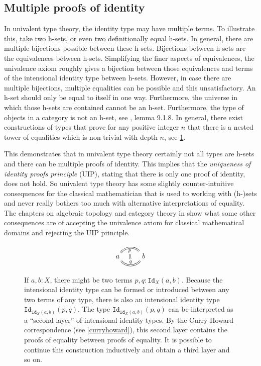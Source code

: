 \documentclass[12pt,a4paper,twoside,xetex]{book} %
\newcommand{\keyword}[1]{\emph{#1}\index{#1}}
\newcommand{\op}[1]{\mathtt{#1}}
\begin{document}
\subsection{Multiple proofs of identity}

In univalent type theory, the identity type may have multiple terms. To illustrate this, take two h-sets, or even two definitionally equal h-sets. In general, there are 
multiple bijections possible between these h-sets. Bijections between h-sets 
are the equivalences between h-sets. Simplifying the finer aspects of 
equivalences, the univalence axiom roughly gives a bijection between those equivalences and terms of the intensional identity 
type between h-sets. However, in case there are multiple bijections, 
multiple equalities can be possible and this unsatisfactory. An h-set should only be equal to 
itself in one way. Furthermore, the universe in which those h-sets are contained 
cannot be an h-set. Furthermore, the type of objects in a category is not an h-set, see \cite{Voevodsky2013}, 
lemma 9.1.8. In general, there exist constructions of types that prove for any 
positive integer $n$ that there is a nested tower of equalities which is non-trivial 
with depth $n$, see \cref{secondleveleq}.  

This demonstrates that in univalent type theory certainly not all types are h-sets and there can be multiple proofs of identity. This implies that the \keyword{uniqueness of identity proofs 
principle} (UIP), stating that there is only one proof of identity, does not hold. So univalent type theory has some slightly 
counter-intuitive consequences for the classical mathematician that is used to 
working with (h-)sets and never really bothers too much with alternative 
interpretations of equality. The chapters on algebraic topology and category 
theory in \cite{Voevodsky2013} show what some other consequences are of 
accepting the univalence axiom for classical mathematical domains and rejecting 
the UIP principle.

\begin{figure}\label{secondleveleq}
 \centering
 
\[ \begin{tikzcd}
a \arrow[equal, r, bend left=50, "p"{name=U, below}]
\arrow[equal, r, bend right=50, "q"{name=D}]
& b
\arrow[equal, r, from=U, to=D]
\end{tikzcd}
\]
 \caption{If $a,b:X$, there might be two terms $p,q:\op{Id}_X(a,b)$. Because the 
 intensional identity type can be formed or introduced between any two terms of 
 any type, there is also an intensional identity type 
 $\op{Id}_{\op{Id}_X(a,b)}(p,q)$. The type $\op{Id}_{\op{Id}_X(a,b)}(p,q)$ can be interpreted as a 
``second layer'' of intensional identity types. By the Curry-Howard correspondence (see \cref{curryhoward}), this second layer 
contains the proofs of equality between proofs of equality. It is possible to 
continue this construction inductively and obtain a third layer and so on. }
\end{figure}
\end{document}
